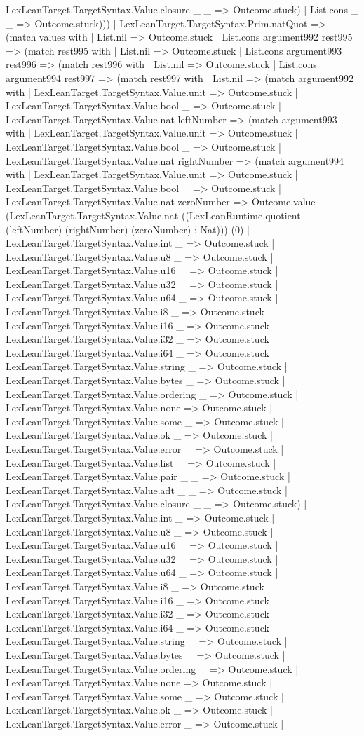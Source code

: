 \documentclass[11pt]{article}
\begin{document}
LexLeanTarget.TargetSyntax.Value.closure \_ \_ => Outcome.stuck) | List.cons \_ \_ => Outcome.stuck))) | LexLeanTarget.TargetSyntax.Prim.natQuot => (match values with | List.nil => Outcome.stuck | List.cons argument992 rest995 => (match rest995 with | List.nil => Outcome.stuck | List.cons argument993 rest996 => (match rest996 with | List.nil => Outcome.stuck | List.cons argument994 rest997 => (match rest997 with | List.nil => (match argument992 with | LexLeanTarget.TargetSyntax.Value.unit => Outcome.stuck | LexLeanTarget.TargetSyntax.Value.bool \_ => Outcome.stuck | LexLeanTarget.TargetSyntax.Value.nat leftNumber => (match argument993 with | LexLeanTarget.TargetSyntax.Value.unit => Outcome.stuck | LexLeanTarget.TargetSyntax.Value.bool \_ => Outcome.stuck | LexLeanTarget.TargetSyntax.Value.nat rightNumber => (match argument994 with | LexLeanTarget.TargetSyntax.Value.unit => Outcome.stuck | LexLeanTarget.TargetSyntax.Value.bool \_ => Outcome.stuck | LexLeanTarget.TargetSyntax.Value.nat zeroNumber => Outcome.value (LexLeanTarget.TargetSyntax.Value.nat ((LexLeanRuntime.quotient (leftNumber) (rightNumber) (zeroNumber) : Nat))) (0) | LexLeanTarget.TargetSyntax.Value.int \_ => Outcome.stuck | LexLeanTarget.TargetSyntax.Value.u8 \_ => Outcome.stuck | LexLeanTarget.TargetSyntax.Value.u16 \_ => Outcome.stuck | LexLeanTarget.TargetSyntax.Value.u32 \_ => Outcome.stuck | LexLeanTarget.TargetSyntax.Value.u64 \_ => Outcome.stuck | LexLeanTarget.TargetSyntax.Value.i8 \_ => Outcome.stuck | LexLeanTarget.TargetSyntax.Value.i16 \_ => Outcome.stuck | LexLeanTarget.TargetSyntax.Value.i32 \_ => Outcome.stuck | LexLeanTarget.TargetSyntax.Value.i64 \_ => Outcome.stuck | LexLeanTarget.TargetSyntax.Value.string \_ => Outcome.stuck | LexLeanTarget.TargetSyntax.Value.bytes \_ => Outcome.stuck | LexLeanTarget.TargetSyntax.Value.ordering \_ => Outcome.stuck | LexLeanTarget.TargetSyntax.Value.none => Outcome.stuck | LexLeanTarget.TargetSyntax.Value.some \_ => Outcome.stuck | LexLeanTarget.TargetSyntax.Value.ok \_ => Outcome.stuck | LexLeanTarget.TargetSyntax.Value.error \_ => Outcome.stuck | LexLeanTarget.TargetSyntax.Value.list \_ => Outcome.stuck | LexLeanTarget.TargetSyntax.Value.pair \_ \_ => Outcome.stuck | LexLeanTarget.TargetSyntax.Value.adt \_ \_ => Outcome.stuck | LexLeanTarget.TargetSyntax.Value.closure \_ \_ => Outcome.stuck) | LexLeanTarget.TargetSyntax.Value.int \_ => Outcome.stuck | LexLeanTarget.TargetSyntax.Value.u8 \_ => Outcome.stuck | LexLeanTarget.TargetSyntax.Value.u16 \_ => Outcome.stuck | LexLeanTarget.TargetSyntax.Value.u32 \_ => Outcome.stuck | LexLeanTarget.TargetSyntax.Value.u64 \_ => Outcome.stuck | LexLeanTarget.TargetSyntax.Value.i8 \_ => Outcome.stuck | LexLeanTarget.TargetSyntax.Value.i16 \_ => Outcome.stuck | LexLeanTarget.TargetSyntax.Value.i32 \_ => Outcome.stuck | LexLeanTarget.TargetSyntax.Value.i64 \_ => Outcome.stuck | LexLeanTarget.TargetSyntax.Value.string \_ => Outcome.stuck | LexLeanTarget.TargetSyntax.Value.bytes \_ => Outcome.stuck | LexLeanTarget.TargetSyntax.Value.ordering \_ => Outcome.stuck | LexLeanTarget.TargetSyntax.Value.none => Outcome.stuck | LexLeanTarget.TargetSyntax.Value.some \_ => Outcome.stuck | LexLeanTarget.TargetSyntax.Value.ok \_ => Outcome.stuck | LexLeanTarget.TargetSyntax.Value.error \_ => Outcome.stuck | 
\end{document}
